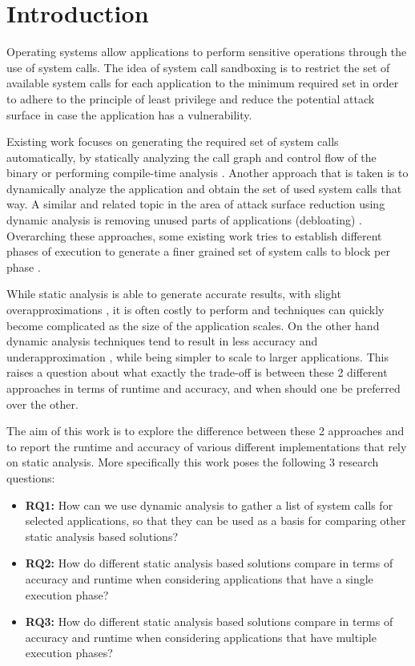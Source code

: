 \section{Introduction}
Operating systems allow applications to perform sensitive operations through the use of system calls. The idea of system call sandboxing is to restrict the set of available system calls for each application to the minimum required set in order to adhere to the principle of least privilege and reduce the potential attack surface in case the application has a vulnerability.

Existing work focuses on generating the required set of system calls automatically, by statically analyzing the call graph and control flow of the binary \cite{ref_sp_3,ref_sp_2} or performing compile-time analysis \cite{ref_sp_1}.
Another approach that is taken is to dynamically analyze the application \cite{ref_dyn_1} and obtain the set of used system calls that way. A similar and related topic in the area of attack surface reduction using dynamic analysis is removing unused parts of applications (debloating) \cite{ref_debloat_1,ref_debloat_2}. %
Overarching these approaches, some existing work tries to establish different phases of execution to generate a finer grained set of system calls to block per phase \cite{ref_mp_1}.

While static analysis is able to generate accurate results, with slight overapproximations \cite{ref_dyn_1}, it is often costly to perform \cite{ref_sp_1} and techniques can quickly become complicated as the size of the application scales.
On the other hand dynamic analysis techniques tend to result in less accuracy and underapproximation \cite{ref_sp_3}, while being simpler to scale to larger applications.
This raises a question about what exactly the trade-off is between these 2 different approaches in terms of runtime and accuracy, and when should one be preferred over the other.

The aim of this work is to explore the difference between these 2 approaches and to report the runtime and accuracy of various different implementations that rely on static analysis.
More specifically this work poses the following 3 research questions:
\begin{itemize}
    \item{\textbf{RQ1:} How can we use dynamic analysis to gather a list of system calls for selected applications, so that they can be used as a basis for comparing other static analysis based solutions?}
    \item{\textbf{RQ2:} How do different static analysis based solutions compare in terms of accuracy and runtime when considering applications that have a single execution phase?}
    \item{\textbf{RQ3:} How do different static analysis based solutions compare in terms of accuracy and runtime when considering applications that have multiple execution phases?}
\end{itemize}

